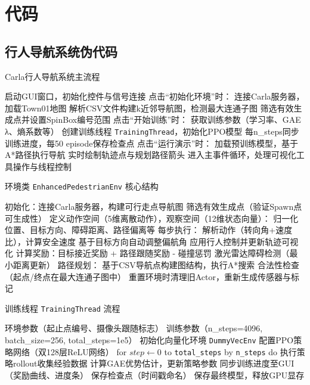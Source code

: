 \chapter{代码}

\section{行人导航系统伪代码}

\renewcommand{\thealgorithm}{A.\arabic{algorithm}}

\begin{algorithm}[H]
\caption{Carla行人导航系统主流程}
\begin{algorithmic}[1]
\STATE 启动GUI窗口，初始化控件与信号连接
\STATE 点击“初始化环境”时：
    \STATE \quad 连接Carla服务器，加载Town01地图
    \STATE \quad 解析CSV文件构建k近邻导航图，检测最大连通子图
    \STATE \quad 筛选有效生成点并设置SpinBox编号范围
\STATE 点击“开始训练”时：
    \STATE \quad 获取训练参数（学习率、GAE λ、熵系数等）
    \STATE \quad 创建训练线程 \texttt{TrainingThread}，初始化PPO模型
    \STATE \quad 每n\_steps同步训练进度，每50 episode保存检查点
\STATE 点击“运行演示”时：
    \STATE \quad 加载预训练模型，基于A*路径执行导航
    \STATE \quad 实时绘制轨迹点与规划路径箭头
\STATE 进入主事件循环，处理可视化工具操作与线程控制
\end{algorithmic}
\end{algorithm}

\begin{algorithm}[H]
\caption{环境类 \texttt{EnhancedPedestrianEnv} 核心结构}
\begin{algorithmic}[1]
\STATE 初始化：连接Carla服务器，构建可行走点导航图
\STATE 筛选有效生成点（验证Spawn点可生成性）
\STATE 定义动作空间（5维离散动作），观察空间（12维状态向量）：
    \STATE \quad 归一化位置、目标方向、障碍距离、路径偏离等
\STATE 每步执行：
    \STATE \quad 解析动作（转向角+速度比），计算安全速度
    \STATE \quad 基于目标方向自动调整偏航角
    \STATE \quad 应用行人控制并更新轨迹可视化
    \STATE \quad 计算奖励：目标接近奖励 + 路径跟随奖励 - 碰撞惩罚
    \STATE \quad 激光雷达障碍检测（最小距离更新）
\STATE 路径规划：
    \STATE \quad 基于CSV导航点构建图结构，执行A*搜索
    \STATE \quad 合法性检查（起点/终点在最大连通子图中）
\STATE 重置环境时清理旧Actor，重新生成传感器与标记
\end{algorithmic}
\end{algorithm}

\begin{algorithm}[H]
\caption{训练线程 \texttt{TrainingThread} 流程}
\begin{algorithmic}[1]
\REQUIRE 环境参数（起止点编号、摄像头跟随标志）
\REQUIRE 训练参数（n\_steps=4096, batch\_size=256, total\_steps=1e5）
\STATE 初始化向量化环境 \texttt{DummyVecEnv}
\STATE 配置PPO策略网络（双128层ReLU网络）
\STATE for $step \leftarrow 0$ to \texttt{total\_steps} by \texttt{n\_steps} do
    \STATE 执行策略rollout收集经验数据
    \STATE 计算GAE优势估计，更新策略参数
    \STATE 同步训练进度至GUI（奖励曲线、进度条）
        \STATE 保存检查点（时间戳命名）
    \ENDIF
\STATE 保存最终模型，释放GPU显存
\end{algorithmic}
\end{algorithm}

